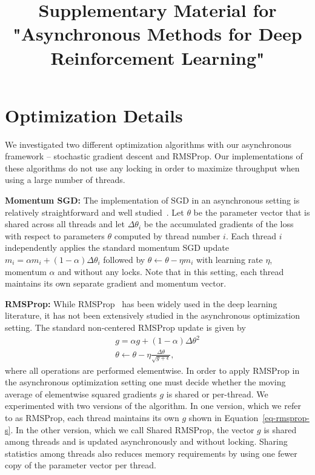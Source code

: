 %
%
%
\title{Supplementary Material for "Asynchronous Methods for Deep Reinforcement Learning"}
\maketitle
\thispagestyle{empty}

\label{supplementary}

\section{Optimization Details}
\label{sec:opt}
We investigated two different optimization algorithms with our asynchronous framework -- stochastic gradient descent and RMSProp.  Our implementations of these algorithms do not use any locking in order to maximize throughput when using a large number of threads.

\textbf{Momentum SGD:}
The implementation of SGD in an asynchronous setting is relatively straightforward and well studied~\citep{recht2011hogwild}.
Let $\theta$ be the parameter vector that is shared across all threads and let $\Delta\theta_i$ be the accumulated gradients of the loss with respect to parameters $\theta$ computed by thread number $i$.
Each thread $i$ independently applies the standard momentum SGD update $m_i = \alpha m_i + (1-\alpha) \Delta\theta_i$ followed by $\theta \gets \theta - \eta m_i$ with learning rate $\eta$, momentum $\alpha$ and without any locks.
Note that in this setting, each thread maintains its own separate gradient and momentum vector.

\textbf{RMSProp:} While RMSProp~\citep{tieleman2012lecture} has been widely used in the deep learning literature, it has not been extensively studied in the asynchronous optimization setting.  The standard non-centered RMSProp update is given by
\begin{eqnarray}
    \label{eq-rmsprop-s}
    g = \alpha g + (1-\alpha)\Delta\theta^2 \\
    \theta \gets \theta - \eta \frac{\Delta\theta}{\sqrt{g+\epsilon}},
\end{eqnarray}
where all operations are performed elementwise.
In order to apply RMSProp in the asynchronous optimization setting one must decide whether the moving average of elementwise squared gradients $g$ is shared or per-thread.
We experimented with two versions of the algorithm.
In one version, which we refer to as RMSProp, each thread maintains its own $g$ shown in Equation~\ref{eq-rmsprop-s}.
In the other version, which we call Shared RMSProp, the vector $g$ is shared among threads and is updated asynchronously and without locking.
%
Sharing statistics among threads also reduces memory requirements by using one fewer copy of the parameter vector per thread.


